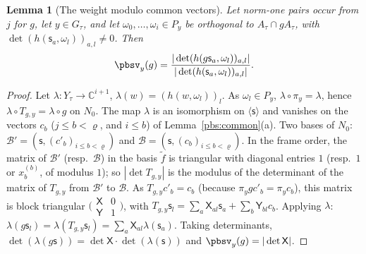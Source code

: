 \documentclass[10pt]{amsart}
\newtheorem{lemma}[theorem]{Lemma}
\theoremstyle{definition}
\theoremstyle{remark}
\newcommand{\C}{\mathbb C}
\begin{document}
\begin{lemma}[The weight modulo common vectors]\label{pbs:mod}
Let norm-one pairs occur from $j$ for $g$, let $y\in G_\tau$, and let $\omega_0,\dots,\omega_i\in P_y$
be orthogonal to $A_\tau\cap gA_\tau$, with $\det(h(\mathsf s_a,\omega_l))_{a,l}\ne0$. Then
\[
\pbsv_y(g)=\frac{|\det(h(g\mathsf s_a,\omega_l))_{a,l}|}{|\det(h(\mathsf s_a,\omega_l))_{a,l}|}.
\]
\end{lemma}
\begin{proof}
Let $\lambda\colon Y_\tau\to\C^{i+1}$, $\lambda(w)=(h(w,\omega_l))_l$. As $\omega_l\in P_y$,
$\lambda\circ\pi_y=\lambda$, hence $\lambda\circ T_{g,y}=\lambda\circ g$ on $N_0$. The map $\lambda$ is
an isomorphism on $\langle\mathsf s\rangle$ and vanishes on the vectors $c_b$ ($j\le b<\varrho$, and
$i\le b$) of Lemma~\ref{pbs:common}(a). Two bases of $N_0$: $\mathcal B'=(\mathsf s,(c'_b)_{i\le b<
\varrho})$ and $\mathcal B=(\mathsf s,(c_b)_{i\le b<\varrho})$. In the frame order, the matrix of
$\mathcal B'$ (resp.\ $\mathcal B$) in the basis $\tilde f$ is triangular with diagonal entries $1$
(resp.\ $1$ or $x^{(b)}_b$, of modulus $1$); so $|\det T_{g,y}|$ is the modulus of the determinant of
the matrix of $T_{g,y}$ from $\mathcal B'$ to $\mathcal B$. As $T_{g,y}c'_b=c_b$ (because $\pi_ygc'_b=
\pi_yc_b$), this matrix is block triangular $\bigl(\begin{smallmatrix}\mathsf X&0\\\mathsf Y&1
\end{smallmatrix}\bigr)$, with $T_{g,y}\mathsf s_l=\sum_a\mathsf X_{al}\mathsf s_a+\sum_b\mathsf Y_{bl}c_b$.
Applying $\lambda$: $\lambda(g\mathsf s_l)=\lambda(T_{g,y}\mathsf s_l)=\sum_a\mathsf X_{al}\lambda(\mathsf
s_a)$. Taking determinants, $\det(\lambda(g\mathsf s))=\det\mathsf X\cdot\det(\lambda(\mathsf s))$ and
$\pbsv_y(g)=|\det\mathsf X|$.
\end{proof}
\end{document}
